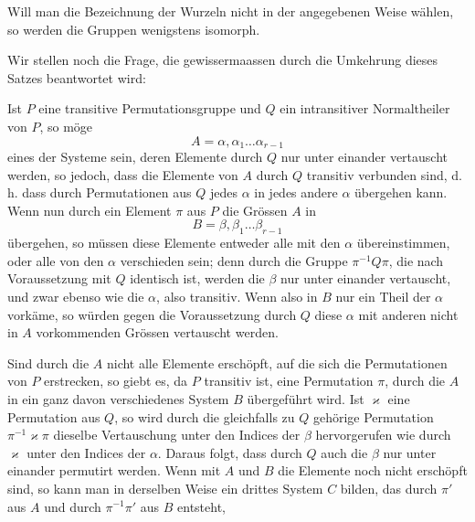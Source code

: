 
Will man die Bezeichnung der Wurzeln nicht in der angegebenen
 Weise w\"ahlen, so werden die Gruppen wenigstens
isomorph.

Wir stellen noch die Frage, die gewissermaassen durch die
Umkehrung dieses Satzes beantwortet wird: 

Ist $P$ eine transitive Permutationsgruppe und $Q$ ein intransitiver
 Normaltheiler von $P$, so m\"oge
\[
A = \alpha, \alpha_1 \ldots \alpha_{r-1}
\]
eines der Systeme sein, deren Elemente durch $Q$ nur unter einander
 vertauscht werden, so jedoch, dass die Elemente von $A$
durch $Q$ transitiv verbunden sind, d.\,h. dass durch Permutationen
aus $Q$ jedes $\alpha$ in jedes andere $\alpha$ \"ubergehen kann. Wenn nun
durch ein Element $\pi$ aus $P$ die Gr\"ossen $A$ in
\[
B = \beta, \beta_1 \ldots \beta_{r-1}
\]
\"ubergehen, so m\"ussen diese Elemente entweder alle mit den $\alpha$
\"ubereinstimmen, oder alle von den $\alpha$ verschieden sein; denn
durch die Gruppe $\pi^{-1} Q \pi$, die nach Voraussetzung mit $Q$ identisch
 ist, werden die $\beta$ nur unter einander vertauscht, und zwar
ebenso wie die $\alpha$, also transitiv. Wenn also in $B$ nur ein Theil
der $\alpha$ vork\"ame, so w\"urden gegen die Voraussetzung durch $Q$
diese $\alpha$ mit anderen nicht in $A$ vorkommenden Gr\"ossen vertauscht
 werden.

Sind durch die $A$ nicht alle Elemente ersch\"opft, auf die
sich die Permutationen von $P$ erstrecken, so giebt es, da $P$
transitiv ist, eine Permutation $\pi$, durch die $A$ in ein ganz davon
verschiedenes System $B$ \"ubergef\"uhrt wird. Ist $\varkappa$ eine Permutation
 aus $Q$, so wird durch die gleichfalls zu $Q$ geh\"orige Permutation
 $\pi^{-1} \varkappa \pi$ dieselbe Vertauschung unter den Indices der $\beta$
hervorgerufen wie durch $\varkappa$ unter den Indices der $\alpha$. Daraus
folgt, dass durch $Q$ auch die $\beta$ nur unter einander permutirt
werden. Wenn mit $A$ und $B$ die Elemente noch nicht ersch\"opft
sind, so kann man in derselben Weise ein drittes System $C$
bilden, das durch $\pi'$ aus $A$ und durch $\pi^{-1}\pi'$ aus $B$ entsteht,
